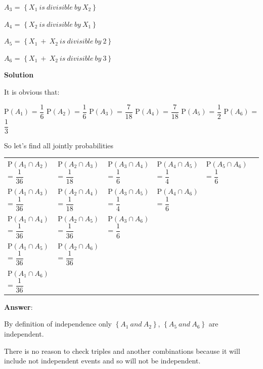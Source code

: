 \documentclass[12pt]{article}
\theoremstyle{definiton}
\theoremstyle{definition}
\theoremstyle{definition}
\begin{document}
$A_3$ = $\left\lbrace X_1\ is\ divisible\ by\ X_2 \right\rbrace$

$A_4$ = $\left\lbrace X_2\ is\ divisible\ by\ X_1 \right\rbrace$

$A_5$ = $\left\lbrace X_1\ +\ X_2\ is\ divisible\ by\ 2 \right\rbrace$

$A_6$ = $\left\lbrace X_1\ +\ X_2\ is\ divisible\ by\ 3 \right\rbrace$
		
		\medskip
		
		\textbf{Solution}

It is obvious that:
\medskip		

P$\left(A_1\right)$ = $\dfrac{1}{6}$
P$\left(A_2\right)$ = $\dfrac{1}{6}$
P$\left(A_3\right)$ = $\dfrac{7}{18}$
P$\left(A_4\right)$ = $\dfrac{7}{18}$
P$\left(A_5\right)$ = $\dfrac{1}{2}$
P$\left(A_6\right)$ = $\dfrac{1}{3}$
\medskip

So let's find all jointly probabilities
\medskip

\begin{table}[h]
\begin{tabular}{llllll}
P$\left(A_1 \cap A_2\right)$ = $\dfrac{1}{36}$  & P$\left(A_2 \cap A_3\right)$ = $\dfrac{1}{18}$ & P$\left(A_3 \cap A_4\right)$ = $\dfrac{1}{6}$ & P$\left(A_4 \cap A_5\right)$ = $\dfrac{1}{4}$ & P$\left(A_5 \cap A_6\right)$ = $\dfrac{1}{6}$ \\[7pt]
P$\left(A_1 \cap A_3\right)$ = $\dfrac{1}{36}$  & P$\left(A_2 \cap A_4\right)$ = $\dfrac{1}{18}$ & P$\left(A_3 \cap A_5\right)$ = $\dfrac{1}{4}$ & P$\left(A_4 \cap A_6\right)$ = $\dfrac{1}{6}$ \\[7pt]
P$\left(A_1 \cap A_4\right)$ = $\dfrac{1}{36}$  & P$\left(A_2 \cap A_5\right)$ = $\dfrac{1}{36}$ & P$\left(A_3 \cap A_6\right)$ = $\dfrac{1}{6}$ &  \\[7pt]
P$\left(A_1 \cap A_5\right)$ = $\dfrac{1}{36}$  & P$\left(A_2 \cap A_6\right)$ = $\dfrac{1}{36}$ &  &  \\[7pt]
P$\left(A_1 \cap A_6\right)$ = $\dfrac{1}{36}$  &  &  &
\end{tabular}
\end{table}				

		\medskip
		\textbf{Answer}:	
			
By definition of independence only 		
$\left\lbrace A_1\ and\ A_2 \right\rbrace$,
$\left\lbrace A_5\ and\ A_6 \right\rbrace$ are independent.

There is no reason to check triples and another combinations because it will include not independent events and so will not be independent.
		
\end{document}
